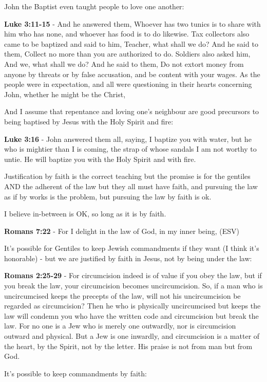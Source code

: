 \documentclass[11pt]{article}
\begin{document}
John the Baptist even taught people to love one another:

\textbf{Luke 3:11-15} - And he answered them, Whoever has two tunics is to share with him who has none, and whoever has food is to do likewise. Tax collectors also came to be baptized and said to him, Teacher, what shall we do? And he said to them, Collect no more than you are authorized to do. Soldiers also asked him, And we, what shall we do? And he said to them, Do not extort money from anyone by threats or by false accusation, and be content with your wages. As the people were in expectation, and all were questioning in their hearts concerning John, whether he might be the Christ,

And I assume that repentance and loving one's neighbour are good precursors to being baptised by Jesus with the Holy Spirit and fire:

\textbf{Luke 3:16} - John answered them all, saying, I baptize you with water, but he who is mightier than I is coming, the strap of whose sandals I am not worthy to untie. He will baptize you with the Holy Spirit and with fire.

Justification by faith is the correct teaching but the promise is for the gentiles AND the adherent of the law but they all must have faith, and pursuing the law as if by works is the problem, but pursuing the law by faith is ok.

I believe in-between is OK, so long as it is by faith.

\textbf{Romans 7:22} - For I delight in the law of God, in my inner being, (ESV)

It's possible for Gentiles to keep Jewish commandments if they want (I think it's honorable) - but we are justified by faith in Jesus, not by being under the law:

\textbf{Romans 2:25-29} - For circumcision indeed is of value if you obey the law, but if you break the law, your circumcision becomes uncircumcision. So, if a man who is uncircumcised keeps the precepts of the law, will not his uncircumcision be regarded as circumcision? Then he who is physically uncircumcised but keeps the law will condemn you who have the written code and circumcision but break the law. For no one is a Jew who is merely one outwardly, nor is circumcision outward and physical. But a Jew is one inwardly, and circumcision is a matter of the heart, by the Spirit, not by the letter. His praise is not from man but from God.

It's possible to keep commandments by faith:
\end{document}
